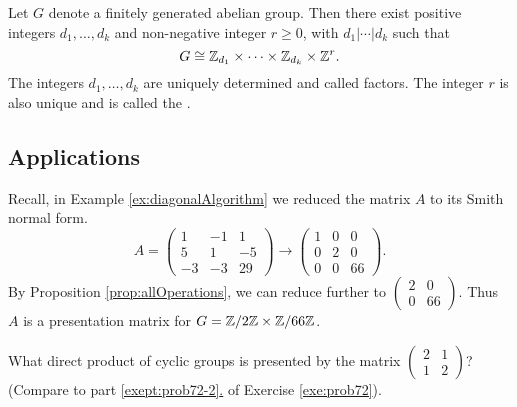 \documentclass[../algebraNotesMSRI-UP2016.tex]{subfiles}
\begin{document}
\begin{frame}[c]{}{}
\begin{thm}\label{thm:ftofgab}
Let $G$ denote a finitely generated abelian group.  Then there exist positive integers $d_1,\dots,d_k$ and non-negative integer $r\geq 0$, with $d_1|\cdots|d_k$ such that
\[
G\cong\mathbb Z_{d_1}\times\cdots\times\mathbb Z_{d_k}\times\mathbb Z^r.
\]
The integers $d_1,\dots,d_k$ are uniquely determined and called  factors.  The integer $r$ is also unique and is called the .
\end{thm}

\end{frame}

\subsection[\subsecname]{Applications}
\begin{frame}[c]{\subsecname}{}
\begin{ex}
Recall, in Example \ref{ex:diagonalAlgorithm} we reduced the matrix $A$ to its Smith normal form. 
\[
A=\begin{pmatrix}
	1 & -1 & 1 \\
	5 & 1 & -5 \\
	-3 & -3 & 29
	\end{pmatrix}\to 
\begin{pmatrix}
1 & 0 & 0 \\
0 & 2 & 0 \\
0 & 0 & 66
\end{pmatrix}.
\]
By Proposition \ref{prop:allOperations}, we can reduce further to $\left(\begin{smallmatrix}
	2 & 0 \\
	0 & 66
	\end{smallmatrix}\right)$.  Thus $A$ is a presentation matrix for $G=\mathbb Z/2\mathbb Z\times \mathbb Z/66\mathbb Z$.
\end{ex}
\end{frame}

\begin{frame}[c]
\begin{exe}[cf. Problem 79]\label{exe:prob79}
What direct product of cyclic groups is presented by the matrix $\begin{pmatrix}
2 & 1 \\
1 & 2
\end{pmatrix}$?  (Compare to part \hyperref[exept:prob72-2]{\ref{exept:prob72-2}.} of Exercise \ref{exe:prob72}).
\end{exe}
\end{frame}
\end{document}
